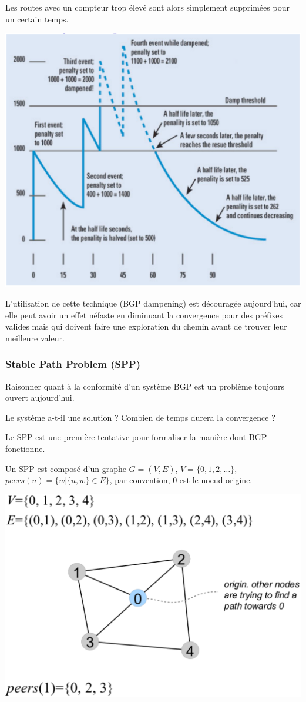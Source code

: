 \documentclass{article}
\begin{document}
\begin{sffamily}
Les routes avec un compteur trop élevé sont alors simplement
supprimées pour un certain temps.

\includegraphics[width=\textwidth]{fab_012.pdf}

L'utilisation de cette technique (BGP dampening) est découragée
aujourd'hui, car elle peut avoir un effet néfaste en diminuant la
convergence pour des préfixes valides mais qui doivent faire une
exploration du chemin avant de trouver leur meilleure valeur.

\subsubsection{Stable Path Problem (SPP)}

Raisonner quant à la conformité d'un système BGP est un problème
toujours ouvert aujourd'hui.

Le système a-t-il une solution ? Combien de temps durera la
convergence ?

Le SPP est une première tentative pour formaliser la manière dont BGP
fonctionne.

Un SPP est composé d'un graphe $G=(V, E)$, $V = \{0,1,2,\dots\}$,
$peers(u)=\{w|\{u,w\} \in E\}$, par convention, $0$ est le noeud
origine.

\includegraphics[width=\textwidth]{fab_013.pdf}


\end{sffamily}
\end{document}
